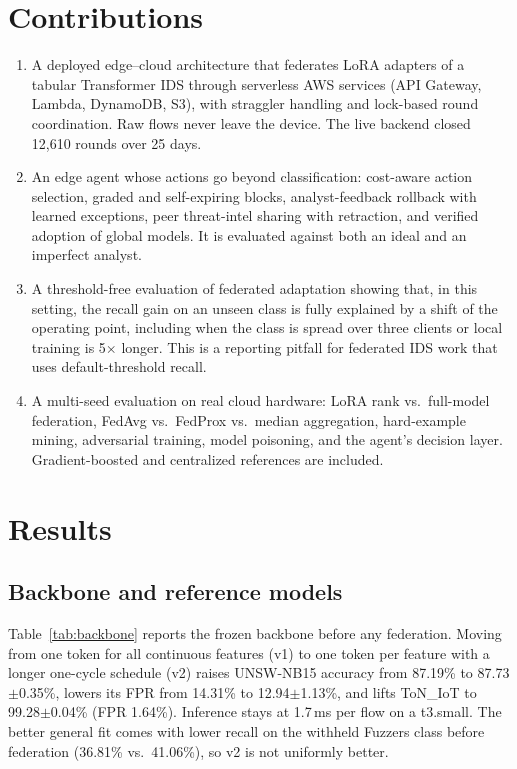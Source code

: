 \section*{Contributions}
\begin{enumerate}
\item A deployed edge--cloud architecture that federates LoRA adapters of a
tabular Transformer IDS through serverless AWS services (API Gateway, Lambda,
DynamoDB, S3), with straggler handling and lock-based round coordination. Raw
flows never leave the device. The live backend closed 12{,}610 rounds over
25 days.
\item An edge agent whose actions go beyond classification: cost-aware action
selection, graded and self-expiring blocks, analyst-feedback rollback with
learned exceptions, peer threat-intel sharing with retraction, and verified
adoption of global models. It is evaluated against both an ideal and an
imperfect analyst.
\item A threshold-free evaluation of federated adaptation showing that, in
this setting, the recall gain on an unseen class is fully explained by a
shift of the operating point, including when the class is spread over three
clients or local training is 5$\times$ longer. This is a reporting pitfall for
federated IDS work that uses default-threshold recall.
\item A multi-seed evaluation on real cloud hardware: LoRA rank vs.\
full-model federation, FedAvg vs.\ FedProx vs.\ median aggregation,
hard-example mining, adversarial training, model poisoning, and the agent's
decision layer. Gradient-boosted and centralized references are included.
\end{enumerate}

\section{Results}

\subsection{Backbone and reference models}
Table~\ref{tab:backbone} reports the frozen backbone before any federation.
Moving from one token for all continuous features (v1) to one token per
feature with a longer one-cycle schedule (v2) raises UNSW-NB15 accuracy from
87.19\% to 87.73$\pm$0.35\%, lowers its FPR from 14.31\% to
12.94$\pm$1.13\%, and lifts ToN\_IoT to 99.28$\pm$0.04\% (FPR 1.64\%).
Inference stays at 1.7\,ms per flow on a t3.small. The better general fit
comes with lower recall on the withheld Fuzzers class before federation
(36.81\% vs.\ 41.06\%), so v2 is not uniformly better.

